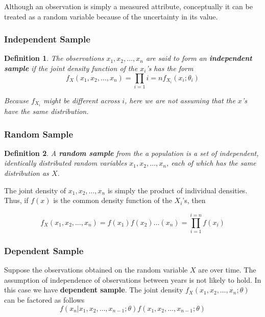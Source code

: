 \documentclass{article}
\newtheorem{definition}{Definition}[section]
\begin{document}
Although an observation is simply a measured attribute, conceptually it can be treated as a random variable because of the uncertainty in its value.

\subsubsection{Independent Sample}

\begin{definition}
    The observations \(x_1,x_2,\dots,x_n\) are said to form an \textbf{independent sample} if the joint density function of the \(x_i\)'s has the form
    \begin{equation*}
        f_X(x_1,x_2,\dots,x_n)=\prod_{i=1}{i=n} f_{X_i}(x_i;\theta_i)
    \end{equation*}

Because \(f_{X_i}\) might be different across \(i\), here we are not assuming that the \(x\)'s have the same distribution.
\end{definition}

\subsubsection{Random Sample}

\begin{definition}
    A \textbf{random sample} from the a population is a set of independent, identically distributed random variables \(x_1,x_2,\dots,x_n\), each of which has the same distribution as \(X\).
\end{definition}

The joint density of \(x_1,x_2,\dots,x_n\) is simply the product of individual densities. Thus, if \(f(x)\) is the common density function of the \(X_i\)'s, then

\begin{equation*}
    f_X(x_1,x_2,\dots,x_n)=f(x_1)f(x_2)\dots(x_n)=\prod_{i=1}^{i=n} f(x_i)
\end{equation*}

\subsubsection{Dependent Sample}

Suppose the observations obtained on the random variable \(X\) are over time. The assumption of independence of observations between years is not likely to hold. In this case we have \textbf{dependent sample}. The joint density \(f_X(x_1,x_2,\dots,x_n; \theta)\) can be factored as follows
\begin{equation*}
    f(x_n|x_1,x_2,\dots,x_{n-1};\theta) f(x_1,x_2,\dots,x_{n-1};\theta)
\end{equation*}
\end{document}
